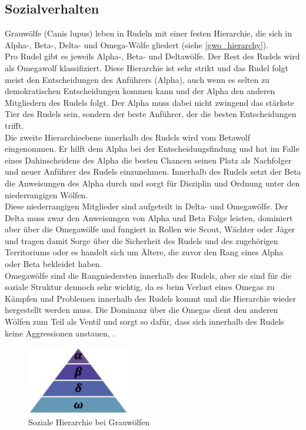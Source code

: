 \subsection{Sozialverhalten}
Grauwölfe (Canis lupus) leben in Rudeln mit einer festen Hierarchie, die sich in Alpha-, Beta-, Delta- und Omega-Wölfe gliedert (siehe \autoref{gwo_hierarchy}). \\
Pro Rudel gibt es jeweils  Alpha-, Beta- und Deltawölfe. Der Rest des Rudels wird als Omegawolf klassifiziert. Diese Hierarchie ist sehr strikt und das Rudel folgt meist den Entscheidungen des Anführers (Alpha), auch wenn es selten zu demokratischen Entscheidungen kommen kann und der Alpha den anderen Mitgliedern des Rudels folgt. Der Alpha muss dabei nicht zwingend das stärkste Tier des Rudels sein, sondern der beste Anführer, der die besten Entscheidungen trifft. \\
Die zweite Hierarchieebene innerhalb des Rudels wird vom Betawolf eingenommen. Er hilft dem Alpha bei der Entscheidungsfindung und hat im Falle eines Dahinscheidens des Alpha die besten Chancen seinen Platz als Nachfolger und neuer Anführer des Rudels einzunehmen. Innerhalb des Rudels setzt der Beta die Anweisungen des Alpha durch und sorgt für Disziplin und Ordnung unter den niederrangigen Wölfen.\\
Diese niederrangigen Mitglieder sind aufgeteilt in Delta- und Omegawölfe. Der Delta muss zwar den Anweisungen von Alpha und Beta Folge leisten, dominiert aber über die Omegawölfe und fungiert in Rollen wie Scout, Wächter oder Jäger und tragen damit Sorge über die Sicherheit des Rudels und des zugehörigen Territoriums oder es handelt sich um Ältere, die zuvor den Rang eines Alpha oder Beta bekleidet haben.\\
Omegawölfe sind die Rangniedersten innerhalb des Rudels, aber sie sind für die soziale Struktur dennoch sehr wichtig, da es beim Verlust eines Omegas zu Kämpfen und Problemen innerhalb des Rudels kommt und die Hierarchie wieder hergestellt werden muss. Die Dominanz über die Omegas dient den anderen Wölfen zum Teil als Ventil und sorgt so dafür, dass sich innerhalb des Rudels keine Aggressionen anstauen, \cite[vgl. Mirjalili 2014, S.4f]{MIRJALILI201446}.\\

\begin{figure}[ht]
    \begin{center}
        \includegraphics[width=0.4\textwidth]{assets/img/Grey_wolf_social_hierarchy.jpg}
        \caption[Soziale Hierarchie bei Grauwölfen]{Soziale Hierarchie bei Grauwölfen \cite{MIRJALILI201446}}
        \label{gwo_hierarchy}
    \end{center}
\end{figure}

